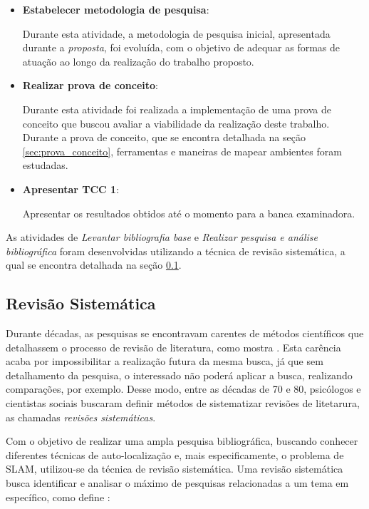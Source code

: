 \begin{itemize}
	\item \textbf{Estabelecer metodologia de pesquisa}:

		Durante esta atividade, a metodologia de pesquisa inicial, apresentada durante a \textit{proposta}, foi evoluída, com o objetivo de adequar as formas de atuação ao longo da realização do trabalho proposto. 

	\item \textbf{Realizar prova de conceito}:

		Durante esta atividade foi realizada a implementação de uma prova de conceito que buscou avaliar a viabilidade da realização deste trabalho. Durante a prova de conceito, que se encontra detalhada na seção \ref{sec:prova_conceito}, ferramentas e maneiras de mapear ambientes foram estudadas.

	\item \textbf{Apresentar TCC 1}:

		Apresentar os resultados obtidos até o momento para a banca examinadora.
\end{itemize}

As atividades de \textit{Levantar bibliografia base} e \textit{Realizar pesquisa e análise bibliográfica} foram desenvolvidas utilizando a técnica de revisão sistemática, a qual se encontra detalhada na seção \ref{sec:revisao_sistematica}.

\subsection{Revisão Sistemática} %
\label{sec:revisao_sistematica}

	Durante décadas, as pesquisas se encontravam carentes de métodos científicos que detalhassem o processo de revisão de literatura, como mostra \cite{revisao_sistematicaUfrj}. Esta carência acaba por impossibilitar a realização futura da mesma busca, já que sem detalhamento da pesquisa, o interessado não poderá aplicar a busca, realizando comparações, por exemplo. Desse modo, entre as décadas de 70 e 80, psicólogos e cientistas sociais buscaram definir métodos de sistematizar revisões de litetarura, as chamadas \textit{revisões sistemáticas}.  
	
	Com o objetivo de realizar uma ampla pesquisa bibliográfica, buscando conhecer diferentes técnicas de auto-localização e, mais especificamente, o problema de SLAM, utilizou-se da técnica de revisão sistemática. Uma revisão sistemática busca identificar e analisar o máximo de pesquisas relacionadas a um tema em específico, como define \cite[p. 8]{revisaoSistematicaComunicacao}:

